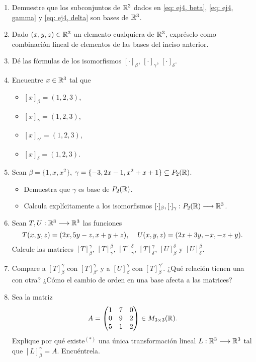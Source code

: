 \begin{enumerate}
	\item Demuestre que los subconjuntos de $\mathbb{R}^{3}$ dados en 
	\eqref{eq: ej4, beta}, \eqref{eq: ej4, gamma} y 
	\eqref{eq: ej4, delta} son bases de $\mathbb{R}^{3}$.
	
	\item Dado $(x, y, z) \in \mathbb{R}^{3}$ un elemento cualquiera de 
	$\mathbb{R}^{3}$, expréselo como combinación lineal de elementos
	de las bases del inciso anterior.
	
	\item Dé las fórmulas de los isomorfismos 
	$[ \cdot ]_{\beta}$, $[ \cdot ]_{\gamma}$, 
	$[ \cdot ]_{\delta}$.
	
	
	\item Encuentre $x \in \mathbb{R}^{3}$ tal que 
	\begin{itemize}
		\item $[x]_{\beta} = (1, 2, 3)$, 
		\item $[x]_{\gamma} = (1, 2, 3)$,
		\item $[x]_{\gamma'} = (1, 2, 3)$,
		\item $[x]_{\delta} = (1, 2, 3)$.
	\end{itemize}
	
	\item Sean $\beta = \{ 1, x, x^{2} \}$,
	$\gamma = \{ -3, 2x-1, x^{2}+x+1 \} \subseteq P_{2}(\mathbb{R})$.
	\begin{itemize}
		\item Demuestra que $\gamma$ es base de $P_{2}(\mathbb{R})$.
		\item Calcula explícitamente a los isomorfismos
		$[\cdot]_{\beta}, [\cdot]_{\gamma}: P_{2}(\mathbb{R}) \longrightarrow \mathbb{R}^{3}$.
	\end{itemize}
	
	\item Sean $T, U : \mathbb{R}^{3} \longrightarrow \mathbb{R}^{3}$ las funciones
	\[
	T(x, y, z) = (2x, 5y-z, x+y+z), \hspace{0.4cm}
	U(x, y, z) = (2x+3y, -x, -z+y).
	\]
	Calcule las matrices 
	$[T]_{\beta}^{\gamma}$, $[T]_{\gamma}^{\beta}$, 
	$[T]_{\gamma}^{\delta}$, $[T]_{\delta}^{\gamma}$,
	$[U]_{\beta}^{\delta}$ y $[U]_{\delta}^{\beta}$.
	
	\item Compare a $[T]_{\beta}^{\gamma}$ con $[T]_{\beta '}^{\gamma}$
	y a 
	$[U]_{\beta}^{\gamma}$ con $[T]_{\beta}^{\gamma '}$. ¿Qué relación
	tienen una con otra? ¿Cómo el cambio de orden en una base afecta
	a las matrices?
	
	\item Sea la matriz
	\[
	A = 
	\begin{pmatrix}
	1 & 7 & 0 \\
	0 & 9 & 2 \\
	5 & 1 & 2
	\end{pmatrix} \in M_{3 \times 3} (\mathbb{R}).
	\]
	Explique por qué existe$^{(*)}$ 
	una única transformación lineal
	$L: \mathbb{R}^{3} \longrightarrow \mathbb{R}^{3}$ tal que 
	$[L]_{\beta}^{\gamma} = A$. Encuéntrela.
	

\end{enumerate}
